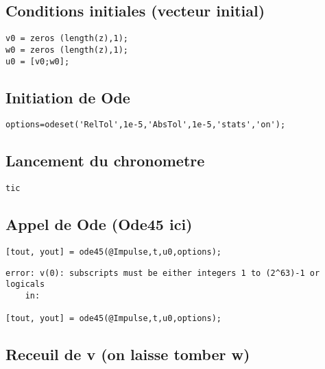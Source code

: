 \documentclass[10pt]{article}
\begin{document}
{}
\subsection*{Conditions initiales (vecteur initial)}

\begin{lstlisting}
v0 = zeros (length(z),1);
w0 = zeros (length(z),1);
u0 = [v0;w0];
\end{lstlisting}


{}
\subsection*{Initiation de Ode}

\begin{lstlisting}
options=odeset('RelTol',1e-5,'AbsTol',1e-5,'stats','on');
\end{lstlisting}


{}
\subsection*{Lancement du chronometre}

\begin{lstlisting}
tic
\end{lstlisting}


{}
\subsection*{Appel de Ode (Ode45 ici)}

\begin{lstlisting}
[tout, yout] = ode45(@Impulse,t,u0,options);
\end{lstlisting}
\begin{lstlisting}[language={},xleftmargin=5pt,frame=none]
error: v(0): subscripts must be either integers 1 to (2^63)-1 or logicals
	in:

[tout, yout] = ode45(@Impulse,t,u0,options);

\end{lstlisting}


{}
\subsection*{Receuil de v (on laisse tomber w)}
\end{document}
